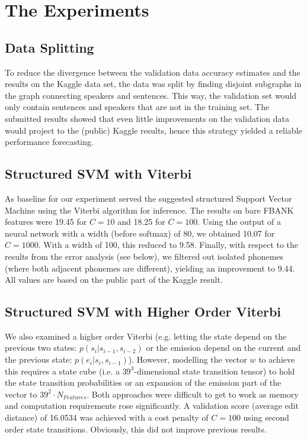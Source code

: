 \documentclass[]{article}
\begin{document}
\section{The Experiments}
\subsection{Data Splitting}
To reduce the divergence between the validation data accuracy estimates and the results on the Kaggle data set, the data was split by finding disjoint subgraphs in the graph connecting speakers and sentences. This way, the validation set would only contain sentences and speakers that are not in the training set. The submitted results showed that even little improvements on the validation data would project to the (public) Kaggle results, hence this strategy yielded a reliable performance forecasting.
\subsection{Structured SVM with Viterbi}
As baseline for our experiment served the suggested structured Support Vector Machine using the Viterbi algorithm for inference. The results on bare FBANK features were 19.45 for $C=10$ and 18.25 for $C=100$. Using the output of a neural network with a width (before softmax) of 80, we obtained 10.07 for $C=1000$. With a width of 100, this reduced to 9.58. Finally, with respect to the results from the error analysis (see below), we filtered out isolated phonemes (where both adjacent phonemes are different), yielding an improvement to 9.44. All values are based on the public part of the Kaggle result.
\subsection{Structured SVM with Higher Order Viterbi}
We also examined a higher order Viterbi (e.g. letting the state depend on the previous two states: $p(s_i|s_{i-1},s_{i-2})$ or the emission depend on the current and the previous state: $p(e_i|s_i,s_{i-1})$). However, modelling the vector $w$ to achieve this requires a state cube (i.e. a $39^3$-dimensional state transition tensor) to hold the state transition probabilities or an expansion of the emission part of the vector to $39^2\cdot N_{Features}$. Both approaches were difficult to get to work as memory and computation requirements rose significantly. A validation score (average edit distance) of 16.0534 was achieved with a cost penalty of $C=100$ using second order state transitions. Obviously, this did not improve previous results.
\end{document}
